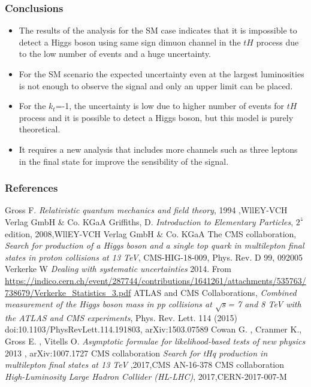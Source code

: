 \documentclass[11pt]{beamer}
\begin{document}
\begin{frame}
\frametitle{Conclusions}
\begin{itemize}
\item The results of the analysis for the SM case indicates that it is impossible to detect a Higgs boson using same sign dimuon channel in the $tH$ process due to the low number of events and a huge uncertainty.
\item For the SM scenario the expected uncertainty even at the largest luminosities is not enough to observe the signal and only an upper limit can be placed.
\item For the $k_t$=-1, the uncertainty is low due to higher number of events for $tH$ process and it is possible to detect a Higgs boson, but this model is purely theoretical.
\item It requires a new analysis that includes more channels such as three leptons in the final state for improve the sensibility of the signal.
\end{itemize}
\end{frame}


	\begin{thebibliography}{99}
		
	\begin{frame}
	\tiny
	\frametitle{References}
	
	Gross F. \textit{Relativistic quantum mechanics and field theory}, 1994 ,WllEY-VCH Verlag GmbH \& Co. KGaA
	 Griffiths, D. \textit{Introduction to Elementary Particles}, $2^\frac{\circ}{}$ edition, 2008,WllEY-VCH Verlag GmbH \& Co. KGaA
		The CMS collaboration, \textit{Search for production of a Higgs boson and a single top
	quark in multilepton final states in proton collisions at 13 TeV}, CMS-HIG-18-009, Phys. Rev. D 99, 092005
	Verkerke W \textit{Dealing with systematic uncertainties} 2014. From
\url{https://indico.cern.ch/event/287744/contributions/1641261/attachments/535763/738679/Verkerke_Statistics_3.pdf}
 ATLAS and CMS
Collaborations, \textit{Combined measurement of the Higgs boson mass in
	pp collisions at $\sqrt{s}$= 7 and 8 TeV with the ATLAS and CMS experiments}, Phys. Rev. Lett.
114 (2015) doi:10.1103/PhysRevLett.114.191803, arXiv:1503.07589
 Cowan G. , Cranmer K., Gross E. , Vitells O.\textit{ Asymptotic formulae for
	likelihood-based tests of new physics} 2013 , arXiv:1007.1727
CMS collaboration \textit{Search for tHq production in multilepton final states at 13 TeV} ,2017,CMS AN-16-378
CMS collaboration \textit{High-Luminosity Large Hadron Collider (HL-LHC)}, 2017,CERN-2017-007-M
\end{frame}
\end{thebibliography}
\end{document}

